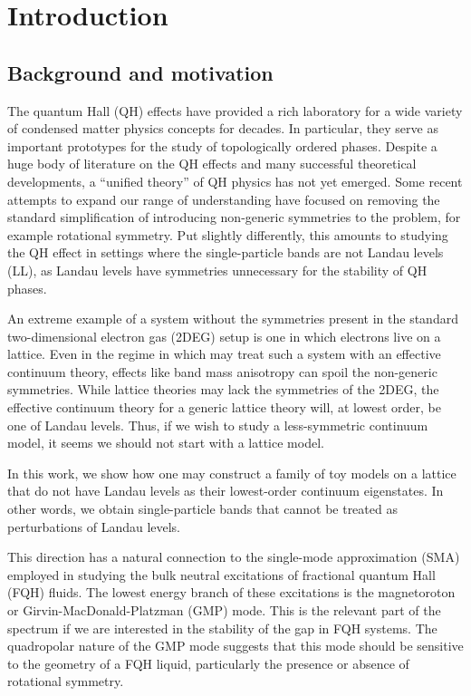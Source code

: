 \documentclass[aps,prb,twocolumn,letterpaper,twoside,nobalancelastpage,groupedaddress,amsmath,amssymb,floatfix,citeautoscript]{revtex4-1}
\begin{document}
\section{Introduction}
\subsection{Background and motivation}
The quantum Hall (QH) effects have provided a rich laboratory for a wide variety of condensed matter physics concepts for decades. In particular, they serve as important prototypes for the study of topologically ordered phases. Despite a huge body of literature on the QH effects and many successful theoretical developments, a ``unified theory'' of QH physics has not yet emerged. Some recent attempts to expand our range of understanding have focused on removing the standard simplification of introducing non-generic symmetries to the problem, for example rotational symmetry. Put slightly differently, this amounts to studying the QH effect in settings where the single-particle bands are not Landau levels (LL), as Landau levels have symmetries unnecessary for the stability of QH phases.

An extreme example of a system without the symmetries present in the standard two-dimensional electron gas (2DEG) setup is one in which electrons live on a lattice. Even in the regime in which may treat such a system with an effective continuum theory, effects like band mass anisotropy can spoil the non-generic symmetries. While lattice theories may lack the symmetries of the 2DEG, the effective continuum theory for a generic lattice theory will, at lowest order, be one of Landau levels. Thus, if we wish to study a less-symmetric continuum model, it seems we should not start with a lattice model.

In this work, we show how one may construct a family of toy models on a lattice that do not have Landau levels as their lowest-order continuum eigenstates. In other words, we obtain single-particle bands that cannot be treated as perturbations of Landau levels. 


This direction  has a natural connection to the single-mode approximation (SMA) employed in studying the bulk neutral excitations of fractional quantum Hall (FQH) fluids. The lowest energy branch of these excitations is the magnetoroton or Girvin-MacDonald-Platzman (GMP) mode. This is the relevant part of the spectrum if we are interested in the stability of the gap in FQH systems. The quadropolar nature of the GMP mode suggests that this mode should be sensitive to the geometry of a FQH liquid, particularly the presence or absence of rotational symmetry.
\end{document}
